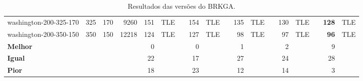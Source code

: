 \begin{table}[!ht]
{\begin{tabular}{lrrrrrrrrrrrrrrrrr}
washington-200-325-170 & 325 & 170 & 9260 & 151 & TLE &  & 154 & TLE &  & 135 & TLE &  & 130 & TLE &  & \textbf{128} & TLE \\
washington-200-350-150 & 350 & 150 & 12218 & 124 & TLE &  & 127 & TLE &  & 98 & TLE &  & 97 & TLE &  & \textbf{96} & TLE \\ \hline
\multicolumn{1}{l}{\textbf{Melhor}} &  &  &  & 0 &  &  & 0 &  &  & 1 &  &  & 2 &  &  & 9 &  \\
\multicolumn{1}{l}{\textbf{Igual}} &  &  &  & 22 &  &  & 17 &  &  & 27 &  &  & 24 &  &  & 28 &  \\
\multicolumn{1}{l}{\textbf{Pior}} &  &  &  & 18 &  &  & 23 &  &  & 12 &  &  & 14 &  &  & 3 &  \\ \hline
\end{tabular}%
}
\caption{Resultados das versões do BRKGA.}
\label{tab:brkga-resultados}
\end{table}

